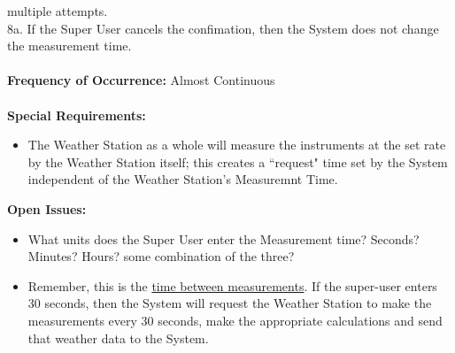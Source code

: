 \documentclass[letterpaper]{article}
\begin{document}
multiple attempts.\\
8a.  If the Super User cancels the confimation, then the System does
not change the measurement time.\\\\
\textbf{Frequency of Occurrence:  }Almost Continuous\\\\
\textbf{Special Requirements: }
\begin{itemize}
\item The Weather Station as a whole will measure the instruments at
the set rate by the Weather Station itself; this creates a ``request"
time set by the System independent of the Weather Station's
Measuremnt Time.
\end{itemize}
\textbf{Open Issues:  }
\begin{itemize}
\item What units does the Super User enter the Measurement time?
Seconds? Minutes? Hours? some combination of the three?
\item Remember, this is the \underline{time between measurements}. If
the super-user enters 30 seconds, then the System will request the
Weather
Station to make the measurements every 30 seconds, make the
appropriate calculations and send that weather data to the System.
\end{itemize}
\end{document}
